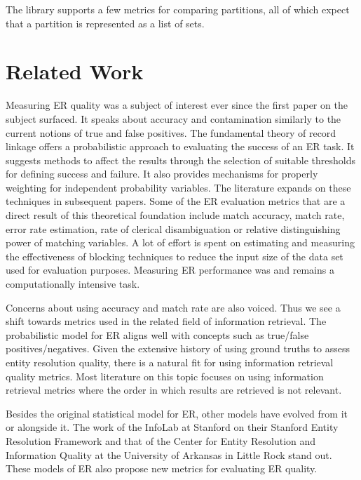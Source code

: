 \documentclass[a4paper,twoside]{article}
\begin{document}
    The library supports a few metrics for comparing partitions, all of which
    expect that a partition is represented as a list of sets.

    \section{Related Work}\label{sec:related}

    Measuring ER quality was a subject of interest ever since the
    first paper on the subject surfaced\cite{newcombe1959}.
    It speaks about accuracy and contamination similarly to the current
    notions of true and false positives.
    The fundamental theory of record linkage\cite{fs1969} offers a probabilistic
    approach to evaluating the success of an ER task.
    It suggests methods to affect the results through the selection of suitable
    thresholds for defining success and failure.
    It also provides mechanisms for properly weighting for independent
    probability variables.
    The literature expands on these techniques in subsequent
    papers\cite{winkler1990}.
    Some of the ER evaluation metrics that are a direct result of
    this theoretical foundation include match accuracy, match
    rate\cite{jaro1989advances}, error rate estimation, rate of clerical
    disambiguation\cite{winkler1990} or relative distinguishing
    power of matching variables\cite{winkler2014}.
    A lot of effort is spent on estimating and measuring the
    effectiveness of blocking techniques to reduce the input size of the data
    set used for evaluation purposes\cite{winkler1990,jaro1989advances}.
    Measuring ER performance was and remains a computationally
    intensive task.
    
    Concerns about using accuracy and match rate are also voiced\cite{Goga2015}.
    Thus we see a shift towards metrics used in the related field of information
    retrieval.
    The probabilistic model for ER aligns well with concepts such
    as true/false positives/negatives.
    Given the extensive history of using ground truths to assess entity
    resolution quality, there is a natural fit for using information retrieval
    quality metrics.
    Most literature on this topic focuses on using information retrieval metrics
    where the order in which results are retrieved is not
    relevant\cite{manning2008}.

    Besides the original statistical model for ER, other models
    have evolved from it or alongside it.
    The work of the InfoLab at Stanford on their Stanford Entity Resolution
    Framework\cite{Ben2009Swoosh} and that of the Center for Entity Resolution
    and Information Quality at the University of Arkansas in Little
    Rock\cite{tal2007algebraic} stand out.
    These models of ER also propose new metrics for evaluating
    ER quality\cite{Men10,Tal11}.
\end{document}
